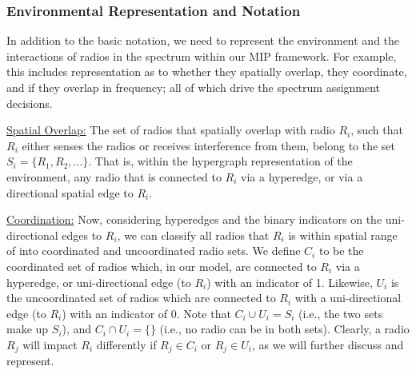 %

\subsubsection{Environmental Representation and Notation}

In addition to the basic notation, we need to represent the environment and the interactions of radios in the spectrum within our MIP framework.  For example, this includes representation as to whether they spatially overlap, they coordinate, and if they overlap in frequency; all of which drive the spectrum assignment decisions.  


\vspace{0.1in}
\uline{Spatial Overlap:} The set of radios that spatially overlap with radio $R_i$, such that $R_i$ either senses the radios or receives interference from them, belong to the set $S_i = \{R_1, R_2, ... \}$.  That is, within the hypergraph representation of the environment, any radio that is connected to $R_i$ via a hyperedge, or via a directional spatial edge to $R_i$.

\vspace{0.1in}
\uline{Coordination:}  Now, considering hyperedges and the binary indicators on the uni-directional edges to $R_i$, we can classify all radios that $R_i$ is within spatial range of into coordinated and uncoordinated radio sets.  We define $C_i$ to be the coordinated set of radios which, in our model, are connected to $R_i$ via a hyperedge, or uni-directional edge (to $R_i$) with an indicator of 1.  Likewise, $U_i$ is the uncoordinated set of radios which are connected to $R_i$ with a uni-directional edge (to $R_i$) with an indicator of 0.  Note that $C_i \cup U_i = S_i$ (i.e., the two sets make up $S_i$), and $C_i \cap U_i = \{\}$ (i.e., no radio can be in both sets).  Clearly, a radio $R_j$ will impact $R_i$ differently if $R_j \in C_i$ or $R_j \in U_i$, as we will further discuss and represent. 


